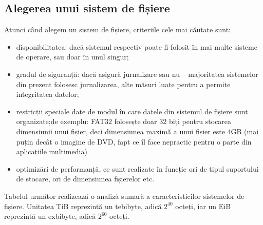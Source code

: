 \subsection{Alegerea unui sistem de fișiere}
\label{sec:file-system-fs-integrity}

Atunci când alegem un sistem de fișiere, criteriile cele mai căutate sunt:

\begin{itemize}
	\item disponibilitatea: dacă sistemul respectiv poate fi folosit în mai
		multe sisteme de operare, sau doar în unul singur;
	\item gradul de siguranță: dacă asigură jurnalizare sau nu – majoritatea
		sistemelor din prezent folosesc jurnalizarea, alte măsuri luate
		pentru a permite integritatea datelor;
	\item restricții speciale date de modul în care datele din sistemul de
		fișiere sunt organizate;de exemplu: FAT32 folosește doar 32 biți
		pentru stocarea dimensiunii unui fișier, deci dimensiunea maximă
		a unui fișier este 4GB (mai puțin decât o imagine de DVD, fapt
		ce îl face nepractic pentru o parte din aplicațiile multimedia)
	\item optimizări de performanță, ce sunt realizate în funcție ori de
		tipul suportului de stocare, ori de dimensiunea fișierelor etc.
\end{itemize}

Tabelul următor realizează o analiză sumară a caracteristicilor sistemelor de
fișiere. Unitatea TiB reprezintă un tebibyte, adică $2^{40}$ octeți, iar un EiB
reprezintă un exbibyte, adică $2^{60}$ octeți.

